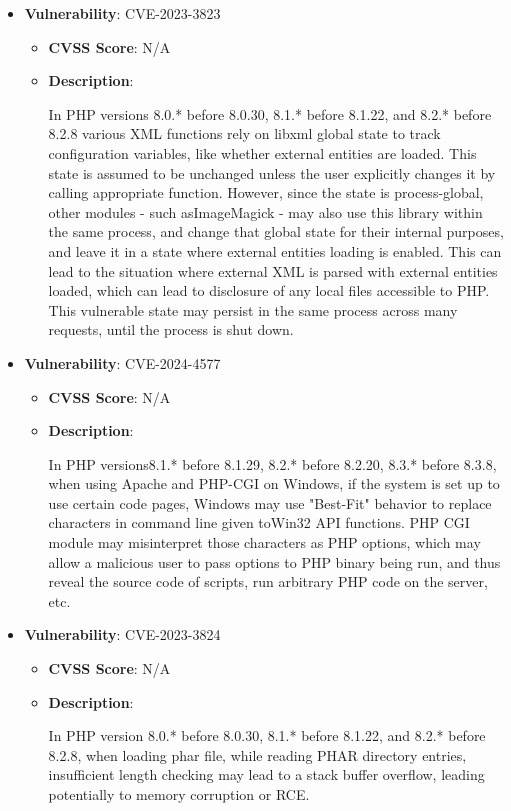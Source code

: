 \documentclass{article}
\begin{document}
\begin{itemize}
        \item \textbf{Vulnerability}: CVE-2023-3823
        \begin{itemize}
            \item \textbf{CVSS Score}:  N/A 
            \item \textbf{Description}:
            \parbox[t]{0.9\linewidth}{
                \ttfamily In PHP versions 8.0.* before 8.0.30, 8.1.* before 8.1.22, and 8.2.* before 8.2.8 various XML functions rely on libxml global state to track configuration variables, like whether external entities are loaded. This state is assumed to be unchanged unless the user explicitly changes it by calling appropriate function. However, since the state is process-global, other modules - such asImageMagick - may also use this library within the same process, and change that global state for their internal purposes, and leave it in a state where external entities loading is enabled. This can lead to the situation where external XML is parsed with external entities loaded, which can lead to disclosure of any local files accessible to PHP. This vulnerable state may persist in the same process across many requests, until the process is shut down.
            }
        \end{itemize}
    
        \item \textbf{Vulnerability}: CVE-2024-4577
        \begin{itemize}
            \item \textbf{CVSS Score}:  N/A 
            \item \textbf{Description}:
            \parbox[t]{0.9\linewidth}{
                \ttfamily In PHP versions8.1.* before 8.1.29, 8.2.* before 8.2.20, 8.3.* before 8.3.8, when using Apache and PHP-CGI on Windows, if the system is set up to use certain code pages, Windows may use "Best-Fit" behavior to replace characters in command line given toWin32 API functions. PHP CGI module may misinterpret those characters as PHP options, which may allow a malicious user to pass options to PHP binary being run, and thus reveal the source code of scripts, run arbitrary PHP code on the server, etc.
            }
        \end{itemize}
    
        \item \textbf{Vulnerability}: CVE-2023-3824
        \begin{itemize}
            \item \textbf{CVSS Score}:  N/A 
            \item \textbf{Description}:
            \parbox[t]{0.9\linewidth}{
                \ttfamily In PHP version 8.0.* before 8.0.30, 8.1.* before 8.1.22, and 8.2.* before 8.2.8, when loading phar file, while reading PHAR directory entries, insufficient length checking may lead to a stack buffer overflow, leading potentially to memory corruption or RCE.
            }
        \end{itemize}
    

\end{itemize}
\end{document}
